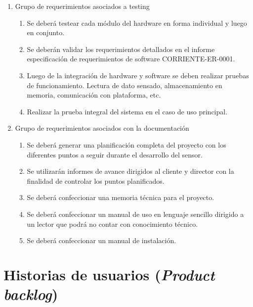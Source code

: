 \documentclass[11pt]{charter}
\begin{document}
\begin{enumerate}
\begin{enumerate}
	\end{enumerate}
\item Grupo de requerimientos asociados a testing
	\begin{enumerate}
	\item Se deberá testear cada módulo del hardware en forma individual y luego en conjunto.
	\item Se deberán validar los requerimientos detallados en el informe especificación de requerimientos de software CORRIENTE-ER-0001.
	\item Luego de la integración de hardware y software se deben realizar pruebas de funcionamiento. Lectura de dato sensado, almacenamiento en memoria, comunicación con plataforma, etc.
	\item Realizar la prueba integral del sistema en el caso de uso principal. 
	\end{enumerate}
\item Grupo de requerimientos asociados con la documentación
	\begin{enumerate}
	\item Se deberá generar una planificación completa del proyecto con los diferentes puntos a seguir durante el desarrollo del sensor.
	\item Se utilizarán informes de avance dirigidos al cliente y director con la finalidad de controlar los puntos planificados.
	\item Se deberá confeccionar una memoria técnica para el proyecto.
	\item Se deberá confeccionar un manual de uso en lenguaje  sencillo dirigido a un lector que podrá no contar con conocimiento técnico.
	\item Se deberá confeccionar un manual de instalación.
	\end{enumerate}
\end{enumerate}


\section{Historias de usuarios (\textit{Product backlog})}
\label{sec:backlog}
\end{document}

